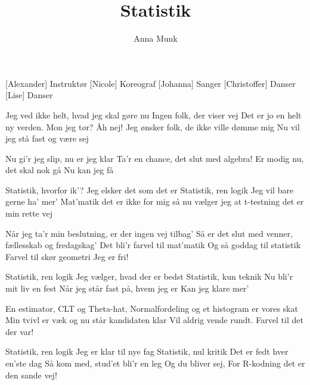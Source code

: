 \documentclass[a4paper,11pt]{article}
\title{Statistik}
\author{Anna Munk}
\begin{document}
\maketitle

\begin{roles}
[Alexander] Instruktør
[Nicole] Koreograf
[Johanna] Sanger 
[Christoffer] Danser 
[Lise] Danser 
\end{roles}

\begin{song}



 Jeg ved ikke helt, hvad jeg skal gøre nu
Ingen folk, der viser vej
Det er jo en helt ny verden. Mon jeg tør? Åh nej!
Jeg ønsker folk, de ikke ville dømme mig
Nu vil jeg stå fast og være sej
 
 Nu gi’r jeg slip, nu er jeg klar
Ta’r en chance, det slut med algebra!
Er modig nu, det skal nok gå
Nu kan jeg få
 
 Statistik, hvorfor ik’?  
Jeg elsker det som det er
Statistik, ren logik
Jeg vil bare gerne ha’ mer’
Mat’matik det er ikke for mig
så nu vælger jeg
at t-testning det er min rette vej
  
 Når jeg ta’r min beslutning, er der ingen vej tilbag’
Så er det slut med venner, fællesskab og fredagskag’
Det bli’r farvel til mat’matik
Og så goddag til statistik
Farvel til skør geometri
Jeg er fri!

 Statistik, ren logik
Jeg vælger, hvad der er bedst
Statistik, kun teknik
Nu bli’r mit liv en fest
Når jeg står fast på, hvem jeg er
Kan jeg klare mer’

 En estimator, CLT og Theta-hat,
Normalfordeling og et histogram er vores skat
Min tvivl er væk og nu står kandidaten klar
Vil aldrig vende rundt. Farvel til det der var!

 Statistik, ren logik
Jeg er klar til nye fag
Statistik, nul kritik
Det er fedt hver en’ste dag
Så kom med, stud’et bli’r en leg
Og du bliver sej,
For R-kodning det er den sande vej!




\end{song}
\end{document}
